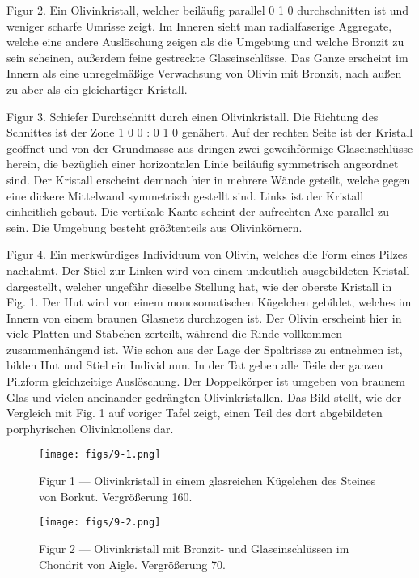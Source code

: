 \documentclass[a4paper, 12pt, oneside]{article}
\begin{document}
Figur 2. Ein Olivinkristall, welcher beiläufig parallel 0 1 0 durchschnitten ist und weniger scharfe Umrisse zeigt. Im Inneren sieht man radialfaserige Aggregate, welche eine andere Auslöschung zeigen als die Umgebung und welche Bronzit zu sein scheinen, außerdem feine gestreckte Glaseinschlüsse. Das Ganze erscheint im Innern als eine unregelmäßige Verwachsung von Olivin mit Bronzit, nach außen zu aber als ein gleichartiger Kristall.

Figur 3. Schiefer Durchschnitt durch einen Olivinkristall. Die Richtung des Schnittes ist der Zone 1 0 0 : 0 1 0 genähert. Auf der rechten Seite ist der Kristall geöffnet und von der Grundmasse aus dringen zwei geweihförmige Glaseinschlüsse herein, die bezüglich einer horizontalen Linie beiläufig symmetrisch angeordnet sind. Der Kristall erscheint demnach hier in mehrere Wände geteilt, welche gegen eine dickere Mittelwand symmetrisch gestellt sind. Links ist der Kristall einheitlich gebaut. Die vertikale Kante scheint der aufrechten Axe parallel zu sein. Die Umgebung besteht größtenteils aus Olivinkörnern.

Figur 4. Ein merkwürdiges Individuum von Olivin, welches die Form eines Pilzes nachahmt. Der Stiel zur Linken wird von einem undeutlich ausgebildeten Kristall dargestellt, welcher ungefähr dieselbe Stellung hat, wie der oberste Kristall in Fig. 1. Der Hut wird von einem monosomatischen Kügelchen gebildet, welches im Innern von einem braunen Glasnetz durchzogen ist. Der Olivin erscheint hier in viele Platten und Stäbchen zerteilt, während die Rinde vollkommen zusammenhängend ist. Wie schon aus der Lage der Spaltrisse zu entnehmen ist, bilden Hut und Stiel ein Individuum. In der Tat geben alle Teile der ganzen Pilzform gleichzeitige Auslöschung. Der Doppelkörper ist umgeben von braunem Glas und vielen aneinander gedrängten Olivinkristallen. Das Bild stellt, wie der Vergleich mit Fig. 1 auf voriger Tafel zeigt, einen Teil des dort abgebildeten porphyrischen Olivinknollens dar.
\clearpage

\vspace*{\fill}
\begin{figure}[H]
\centering
\texttt{[image: figs/9-1.png]}
\caption{\small Figur 1 --- Olivinkristall in einem glasreichen Kügelchen des Steines von Borkut. Vergrößerung 160.}
\end{figure}
\vspace*{\fill}
\clearpage

\vspace*{\fill}
\begin{figure}[H]
\centering
\texttt{[image: figs/9-2.png]}
\caption{\small Figur 2 --- Olivinkristall mit Bronzit- und Glaseinschlüssen im Chondrit von Aigle. Vergrößerung 70.}
\end{figure}
\vspace*{\fill}
\clearpage
\end{document}
